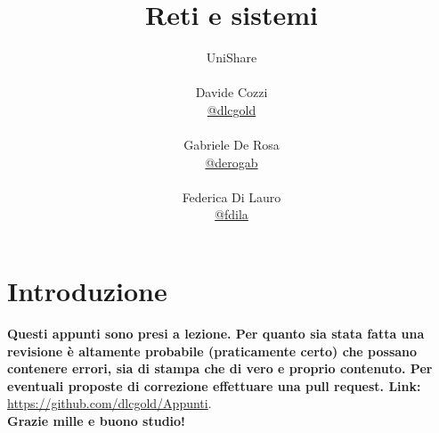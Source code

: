 \documentclass[a4paper,12pt, oneside]{book}
\title{Reti e sistemi}
\author{UniShare\\\\Davide Cozzi\\\href{https://t.me/dlcgold}{@dlcgold}\\\\Gabriele De Rosa\\\href{https://t.me/derogab}{@derogab} \\\\Federica Di Lauro\\\href{https://t.me/f_dila}{@f\textunderscore dila}}
\date{}
\begin{document}
\maketitle


\newtheorem{teorema}{Teorema}
\newtheorem{definizione}{Definizione}
\newtheorem{esempio}{Esempio}
\newtheorem{corollario}{Corollario}
\newtheorem{lemma}{Lemma}
\newtheorem{osservazione}{Osservazione}
\newtheorem{nota}{Nota}
\tableofcontents
\renewcommand{\chaptermark}[1]{%
\markboth{\chaptername
\ \thechapter.\ #1}{}}
\renewcommand{\sectionmark}[1]{\markright{\thesection.\ #1}}

\chapter{Introduzione}
\textbf{Questi appunti sono presi a lezione. Per quanto sia stata fatta una revisione è altamente probabile (praticamente certo) che possano contenere errori, sia di stampa che di vero e proprio contenuto. Per eventuali proposte di correzione effettuare una pull request. Link: } \url{https://github.com/dlcgold/Appunti}.\\
\textbf{Grazie mille e buono studio!}
\end{document}
